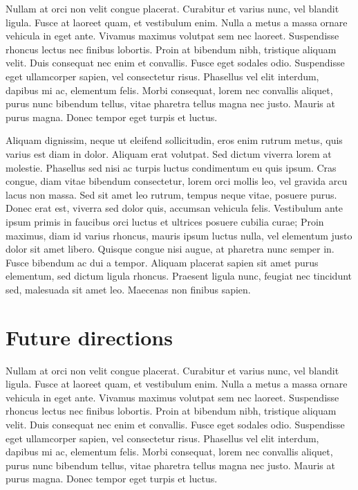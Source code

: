 Nullam at orci non velit congue placerat. Curabitur et varius nunc, vel blandit ligula. Fusce at laoreet quam, et vestibulum enim. Nulla a metus a massa ornare vehicula in eget ante. Vivamus maximus volutpat sem nec laoreet. Suspendisse rhoncus lectus nec finibus lobortis. Proin at bibendum nibh, tristique aliquam velit. Duis consequat nec enim et convallis. Fusce eget sodales odio. Suspendisse eget ullamcorper sapien, vel consectetur risus. Phasellus vel elit interdum, dapibus mi ac, elementum felis. Morbi consequat, lorem nec convallis aliquet, purus nunc bibendum tellus, vitae pharetra tellus magna nec justo. Mauris at purus magna. Donec tempor eget turpis et luctus.

Aliquam dignissim, neque ut eleifend sollicitudin, eros enim rutrum metus, quis varius est diam in dolor. Aliquam erat volutpat. Sed dictum viverra lorem at molestie. Phasellus sed nisi ac turpis luctus condimentum eu quis ipsum. Cras congue, diam vitae bibendum consectetur, lorem orci mollis leo, vel gravida arcu lacus non massa. Sed sit amet leo rutrum, tempus neque vitae, posuere purus. Donec erat est, viverra sed dolor quis, accumsan vehicula felis. Vestibulum ante ipsum primis in faucibus orci luctus et ultrices posuere cubilia curae; Proin maximus, diam id varius rhoncus, mauris ipsum luctus nulla, vel elementum justo dolor sit amet libero. Quisque congue nisi augue, at pharetra nunc semper in. Fusce bibendum ac dui a tempor. Aliquam placerat sapien sit amet purus elementum, sed dictum ligula rhoncus. Praesent ligula nunc, feugiat nec tincidunt sed, malesuada sit amet leo. Maecenas non finibus sapien.


\section{Future directions}

Nullam at orci non velit congue placerat. Curabitur et varius nunc, vel blandit ligula. Fusce at laoreet quam, et vestibulum enim. Nulla a metus a massa ornare vehicula in eget ante. Vivamus maximus volutpat sem nec laoreet. Suspendisse rhoncus lectus nec finibus lobortis. Proin at bibendum nibh, tristique aliquam velit. Duis consequat nec enim et convallis. Fusce eget sodales odio. Suspendisse eget ullamcorper sapien, vel consectetur risus. Phasellus vel elit interdum, dapibus mi ac, elementum felis. Morbi consequat, lorem nec convallis aliquet, purus nunc bibendum tellus, vitae pharetra tellus magna nec justo. Mauris at purus magna. Donec tempor eget turpis et luctus.

